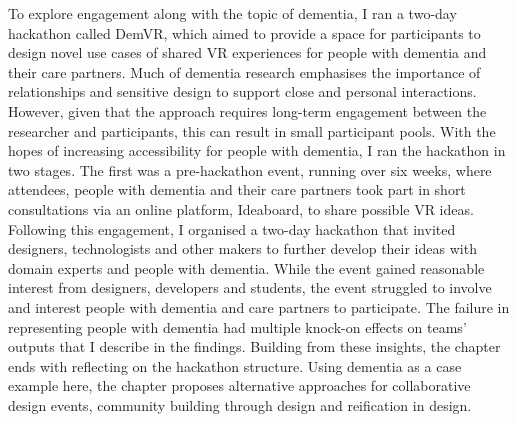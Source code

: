 To explore engagement along with the topic of dementia, I ran a two-day hackathon called DemVR, which aimed to provide a space for participants to design novel use cases of shared VR experiences for people with dementia and their care partners. Much of dementia research emphasises the importance of relationships and sensitive design to support close and personal interactions. However, given that the approach requires long-term engagement between the researcher and participants, this can result in small participant pools. With the hopes of increasing accessibility for people with dementia, I ran the hackathon in two stages. The first was a pre-hackathon event, running over six weeks, where attendees, people with dementia and their care partners took part in short consultations via an online platform, Ideaboard, to share possible VR ideas. Following this engagement, I organised a two-day hackathon that invited designers, technologists and other makers to further develop their ideas with domain experts and people with dementia. While the event gained reasonable interest from designers, developers and students, the event struggled to involve and interest people with dementia and care partners to participate. The failure in representing people with dementia had multiple knock-on effects on teams' outputs that I describe in the findings. Building from these insights, the chapter ends with reflecting on the hackathon structure. Using dementia as a case example here, the chapter proposes alternative approaches for collaborative design events, community building through design and reification in design.



